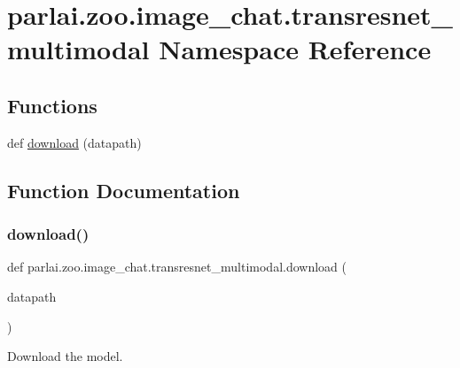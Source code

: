 \hypertarget{namespaceparlai_1_1zoo_1_1image__chat_1_1transresnet__multimodal}{}\section{parlai.\+zoo.\+image\+\_\+chat.\+transresnet\+\_\+multimodal Namespace Reference}
\label{namespaceparlai_1_1zoo_1_1image__chat_1_1transresnet__multimodal}
\subsection*{Functions}
\begin{DoxyCompactItemize}
\item 
def \hyperlink{namespaceparlai_1_1zoo_1_1image__chat_1_1transresnet__multimodal_a07b4f0a9e7658b5b5599d6d71bc08f2a}{download} (datapath)
\end{DoxyCompactItemize}


\subsection{Function Documentation}
\mbox{\label{namespaceparlai_1_1zoo_1_1image__chat_1_1transresnet__multimodal_a07b4f0a9e7658b5b5599d6d71bc08f2a}} 
\subsubsection{\texorpdfstring{download()}{download()}}
{\footnotesize\ttfamily def parlai.\+zoo.\+image\+\_\+chat.\+transresnet\+\_\+multimodal.\+download (\begin{DoxyParamCaption}\item[{}]{datapath }\end{DoxyParamCaption})}

\begin{DoxyVerb}Download the model.
\end{DoxyVerb}
 